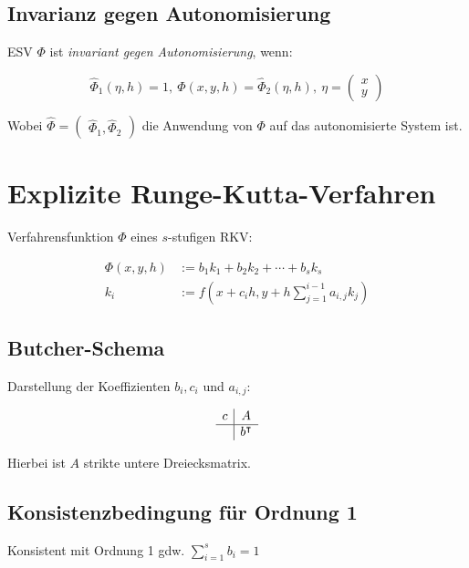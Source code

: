 \subsection*{Invarianz gegen Autonomisierung}

ESV $\Phi$ ist \emph{invariant gegen Autonomisierung}, wenn:

\[ \widehat{\Phi}_1(\eta,h)=1, \ \Phi(x,y,h) = \widehat{\Phi}_2(\eta,h), \ \eta = \begin{pmatrix}x \\ y\end{pmatrix} \]

Wobei $\widehat{\Phi} = \begin{pmatrix}\widehat{\Phi}_1, \widehat{\Phi}_2\end{pmatrix}$ die Anwendung von $\Phi$ auf das autonomisierte System ist.

\section*{Explizite Runge-Kutta-Verfahren}

Verfahrensfunktion $\Phi$ eines $s$-stufigen RKV:

\vspace*{-4mm}
\begin{align*}
\Phi(x,y,h) &:= b_1 k_1 + b_2 k_2 + \cdots + b_s k_s \\
k_i &:= f(x+c_i h, y + h \sum_{j=1}^{i-1} a_{i,j} k_j)
\end{align*}
\vspace*{-8mm}

\subsection*{Butcher-Schema}

Darstellung der Koeffizienten $b_i, c_i$ und $a_{i,j}$:

\[ \begin{array}{c|c}
c & A \\
\hline
  & b^\intercal
\end{array} \]

Hierbei ist $A$ strikte untere Dreiecksmatrix.

\subsection*{Konsistenzbedingung für Ordnung 1}

Konsistent mit Ordnung 1 gdw. $\displaystyle\sum_{i=1}^s b_i = 1$

